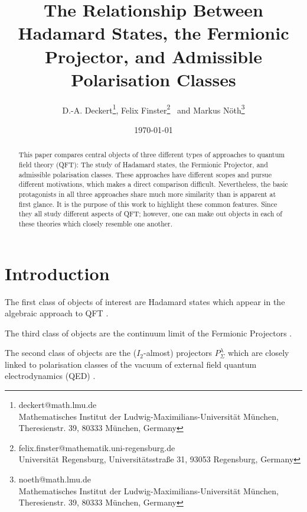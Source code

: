 \documentclass[a4paper,11pt]{article}
\begin{document}
\title{The Relationship Between Hadamard States, the Fermionic Projector, and Admissible Polarisation Classes}

\author{
D.-A. Deckert\thanks{deckert@math.lmu.de \\ \tiny{Mathematisches Institut der Ludwig-Maximilians-Universit\"at M\"unchen,}
    \tiny{Theresienstr. 39, 80333 M\"unchen, Germany}},
Felix Finster\thanks{felix.finster@mathematik.uni-regensburg.de \\     \tiny{Universität Regensburg, Universitätsstraße 31, 93053 Regensburg, Germany}}
	 ~and
Markus Nöth\thanks{noeth@math.lmu.de \\\tiny{Mathematisches Institut der Ludwig-Maximilians-Universit\"at M\"unchen,}
    \tiny{Theresienstr. 39, 80333 M\"unchen, Germany}}

}
\date{\today}



\maketitle

\begin{abstract}
This paper compares central objects of three different types of approaches to quantum field theory (QFT): The study of Hadamard states, the
Fermionic Projector, and admissible polarisation classes.
These approaches have different scopes and pursue different motivations, which makes a direct comparison difficult.
Nevertheless, the basic protagonists in all three approaches share much more similarity than is apparent at first glance.
It is the purpose of this work to highlight these common features. 
Since they all study different aspects of QFT; however, one can make out objects in each of these theories which closely resemble
one another. 
\end{abstract}

\section{Introduction}


The first class of objects of interest are Hadamard states which appear in the algebraic approach to 
QFT \cite{fulling1978singularity}. 

The third class of objects are the continuum limit of the Fermionic Projectors \cite{finster2006principle}. 

The second class of objects are the (\(I_2\)-almost) projectors \(P^\lambda_{\Sigma}\) which are 
closely linked to polarisation classes of the vacuum of external field quantum electrodynamics (QED) \cite{ivp0, ivp1, ivp2}. 
\end{document}
